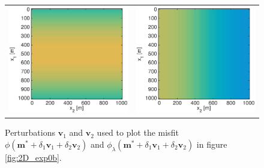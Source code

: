 \documentclass{iopart}
\begin{document}
\begin{figure}
\centering
\begin{tabular}{cc}
\includegraphics[scale=.2]{./figs/2D_exp0_a}&
\includegraphics[scale=.2]{./figs/2D_exp0_e}\\
\end{tabular}
\caption{Perturbations $\mathbf{v}_1$ and $\mathbf{v}_2$ used to plot the misfit $\phi(\mathbf{m}^* + \delta_1\mathbf{v}_1 + \delta_2\mathbf{v}_2)$ and $\phi_{\lambda}(\mathbf{m}^* + \delta_1\mathbf{v}_1 + \delta_2\mathbf{v}_2)$ in figure \ref{fig:2D_exp0b}.}
\label{fig:2D_exp0a}
\end{figure}
\end{document}
